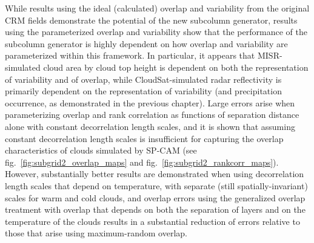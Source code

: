 While results using the ideal (calculated) overlap and variability from
the original CRM fields demonstrate the potential of the new subcolumn
generator, results using the parameterized overlap and variability show
that the performance of the subcolumn generator is highly dependent on
how overlap and variability are parameterized within this framework. In
particular, it appears that MISR-simulated cloud area by cloud top
height is dependent on both the representation of variability and of
overlap, while CloudSat-simulated radar reflectivity is primarily
dependent on the representation of variability (and precipitation
occurrence, as demonstrated in the previous chapter). Large errors arise
when parameterizing overlap and rank correlation as functions of
separation distance alone with constant decorrelation length scales, and
it is shown that assuming constant decorrelation length scales is
insufficient for capturing the overlap characteristics of clouds
simulated by SP-CAM (see fig.~\ref{fig:subgrid2_overlap_maps} and
fig.~\ref{fig:subgrid2_rankcorr_maps}). However, substantially better
results are demonstrated when using decorrelation length scales that
depend on temperature, with separate (still spatially-invariant) scales
for warm and cold clouds, and overlap errors using the generalized
overlap treatment with overlap that depends on both the separation of
layers and on the temperature of the clouds results in a substantial
reduction of errors relative to those that arise using maximum-random
overlap.

